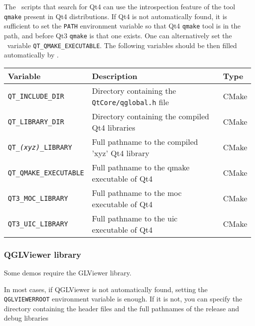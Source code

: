 The \cmake\ scripts that search for Qt4 can use the introspection feature
of the tool \texttt{qmake} present in Qt4 distributions. If Qt4 is not
automatically found, it is sufficient to set the \texttt{PATH}
environment variable so that Qt4 \texttt{qmake} tool is in the path, and
before Qt3 \texttt{qmake} is that one exists. One can alternatively set the
\cmake\ variable \texttt{QT\_QMAKE\_EXECUTABLE}. The following variables
should be then filled automatically by \cmake{}.
\renewcommand{\arraystretch}{1.3}
\gdef\lcTabularBorder{2}
\begin{tabular}{|l|l|l|} \hline
  \textbf{Variable}                 & \textbf{Description}                                             & \textbf{Type}\\\hline\hline
  \texttt{QT\_INCLUDE\_DIR}         & Directory containing the \texttt{QtCore/qglobal.h} file          & CMake\\\hline
  \texttt{QT\_LIBRARY\_DIR}         & Directory containing the compiled Qt4 libraries                  & CMake\\\hline
  \texttt{QT\_{\em (xyz)}\_LIBRARY} & Full pathname to the compiled 'xyz' Qt4 library\footnotemark[17] & CMake\\\hline
  \texttt{QT\_QMAKE\_EXECUTABLE}    & Full pathname to the qmake executable of Qt4                     & CMake\\\hline
  \texttt{QT3\_MOC\_LIBRARY}        & Full pathname to the moc executable of Qt4                       & CMake\\\hline
  \texttt{QT3\_UIC\_LIBRARY}        & Full pathname to the uic executable of Qt4                       & CMake\\\hline
\end{tabular}
\addtocounter{footnote}{1}

\subsubsection{QGLViewer library}

Some demos require the GLViewer library.

In most cases, if QGLViewer is not automatically found, setting the \texttt{QGLVIEWERROOT} 
environment variable is enough. If it is not, you can specify the directory containing 
the header files and the full pathnames of the release and debug libraries

